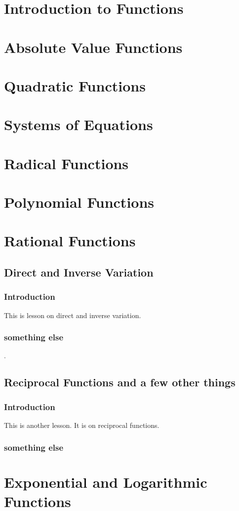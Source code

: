 \documentclass[12pt,letterpaper]{memoir}
\begin{document}
\checkandfixthelayout

\pagestyle{myPagestyle}

\frontmatter
\tableofcontents*

\mainmatter
{} 
\part{Introduction to Functions}
\part{Absolute Value Functions}
\part{Quadratic Functions}
\part{Systems of Equations}

\part{Radical Functions}
\part{Polynomial Functions}
\part{Rational Functions}

\chapter{Direct and Inverse Variation}
\section{Introduction}
This is lesson on direct and inverse variation.

\section{something else}
\Blindtext.

\chapter{Reciprocal Functions and a few other things}

\section{Introduction}
This is another lesson. It is on reciprocal functions.

\section{something else}
\Blindtext
\Blindtext
\Blindtext

\part{Exponential and Logarithmic Functions}

\forOL
{}

\forPAP
{}
\end{document}
